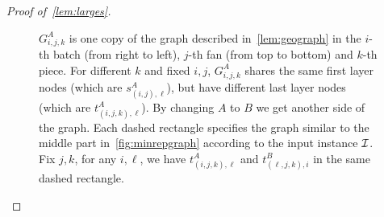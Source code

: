 \begin{proof}[Proof of~\cref{lem:larges}]
\begin{figure}
\begin{center}
		\end{center}
		\caption{$G^A_{i,j,k}$ is one copy of the graph described in~\cref{lem:geograph} in the $i$-th batch (from right to left), $j$-th fan (from top to bottom) and $k$-th piece. For different $k$ and fixed $i,j$, $G^A_{i,j,k}$ shares the same first layer nodes (which are $s^A_{(i,j),\ell}$), but have different last layer nodes (which are $t^A_{(i,j,k),\ell}$). By changing $A$ to $B$ we get another side of the graph. Each dashed rectangle specifies the graph similar to the middle part in~\cref{fig:minrepgraph} according to the input \labcov{} instance $\mathcal{I}$. Fix $j,k$, for any $i,\ell$, we have $t^A_{(i,j,k),\ell}$ and $t^B_{(\ell,j,k),i}$ in the same dashed rectangle. }\label{fig:large}
	\end{figure}
	
	

\end{proof}
